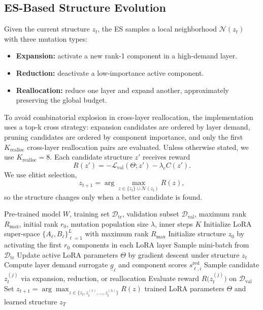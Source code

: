 \documentclass{article}
\newcommand{\method}{\textsc{EvoRank-LoRA}}
\newcommand{\Rmax}{R_{\max}}
\begin{document}
\subsection{ES-Based Structure Evolution}
Given the current structure $z_t$, the ES samples a local neighborhood $\mathcal{N}(z_t)$ with three mutation types:
\begin{itemize}[leftmargin=1.2em]
    \item \textbf{Expansion:} activate a new rank-1 component in a high-demand layer.
    \item \textbf{Reduction:} deactivate a low-importance active component.
    \item \textbf{Reallocation:} reduce one layer and expand another, approximately preserving the global budget.
\end{itemize}
To avoid combinatorial explosion in cross-layer reallocation, the implementation uses a top-k cross strategy: expansion candidates are ordered by layer demand, pruning candidates are ordered by component importance, and only the first $K_{\mathrm{realloc}}$ cross-layer reallocation pairs are evaluated. Unless otherwise stated, we use $K_{\mathrm{realloc}} = 8$.
Each candidate structure $z'$ receives reward
\begin{equation}
    R(z') = -\mathcal{L}_{\mathrm{val}}(\Theta; z') - \lambda_c C(z').
\end{equation}
We use elitist selection,
\begin{equation}
    z_{t+1} = \arg\max_{z \in \{z_t\} \cup \mathcal{N}(z_t)} R(z),
\end{equation}
so the structure changes only when a better candidate is found.

\begin{algorithm}[t]
\caption{Training procedure of \method}
\label{alg:main}
\begin{algorithmic}[1]
\Require Pre-trained model $W$, training set $\mathcal{D}_{\mathrm{tr}}$, validation subset $\mathcal{D}_{\mathrm{val}}$, maximum rank $\Rmax$, initial rank $r_0$, mutation population size $\lambda$, inner steps $K$
\State Initialize LoRA super-space $\{A_\ell, B_\ell\}_{\ell=1}^L$ with maximum rank $\Rmax$
\State Initialize structure $z_0$ by activating the first $r_0$ components in each LoRA layer
        \State Sample mini-batch from $\mathcal{D}_{\mathrm{tr}}$
        \State Update active LoRA parameters $\Theta$ by gradient descent under structure $z_t$
    \EndFor
    \State Compute layer demand surrogate $\underline{g}_\ell$ and component scores $s^{\mathrm{red}}_{\ell,i}$
        \State Sample candidate $z_t^{(j)}$ via expansion, reduction, or reallocation
        \State Evaluate reward $R\big(z_t^{(j)}\big)$ on $\mathcal{D}_{\mathrm{val}}$
    \EndFor
    \State Set $z_{t+1} = \arg\max_{z \in \{z_t, z_t^{(1)}, \dots, z_t^{(\lambda)}\}} R(z)$
\EndFor
\State \Return trained LoRA parameters $\Theta$ and learned structure $z_T$
\end{algorithmic}
\end{algorithm}
\end{document}
